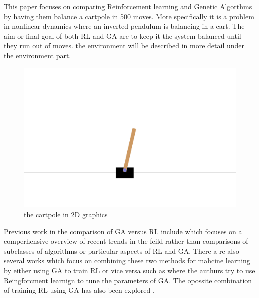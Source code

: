 This paper focuses on comparing Reinforcement learning and Genetic Algorthms by having them balance a cartpole in 500 moves. More specifically it is a problem in nonlinear dynamics where an inverted pendulum is balancing in a cart. The aim or final goal of both RL and GA are to keep it the system balanced until they run out of moves. the environment will be described in more detail under the environment part.  
\begin{figure}[H]
    \centering
    \includegraphics [scale = 0.18]{Images/cartpole.png}
    \caption{the cartpole in 2D graphics}
    \label{figRL}
\end{figure}
Previous work in the comparison of GA versus RL include \cite{drugan2019reinforcement} which focuses on a comperhensive overview of recent trends in the feild rather than comparisons of subclasses of algorithms or particular aspects of RL and GA. There a re also several works which focus on combining these two methods for mahcine learning by either using GA to train RL or vice versa such as \cite{eiben2007reinforcement} where the authurs try to use Reingforcment learnign to tune the parameters of GA. The opossite combination of training RL using GA has also been explored \cite{khadka2018evolutionary}.



